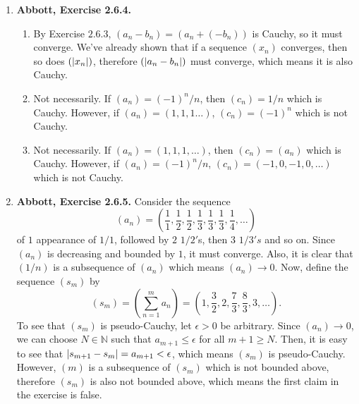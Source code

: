 \documentclass{article}
\DeclarePairedDelimiter\abs{\lvert}{\rvert}
\newcommand{\N}{\mathbb{N}}
\newcommand{\R}{\mathbb{R}}
\newcommand{\exc}[2][Abbott]{\item \textbf{#1, Exercise #2.}}
\newcommand{\lep}[1][L]{#1et $\epsilon > 0$ be arbitrary}
\begin{document}
\begin{enumerate}
\begin{enumerate}
        \item \lep. Since both sequences are Cauchy, we can pick some positive $M_1, M_2 \in \R$ such that $\abs*{x_n} \leq M_1$ and $\abs*{y_n} \leq M_2$ for all $n \in \N$. Choose $N \in \N$ such that $\abs*{x_n-x_m} < \epsilon/(2M_2)$ and $\abs*{y_n-y_m} < \epsilon/(2M_1)$ for all $n, m \geq N$. Then,
        \begin{align*}
            \abs*{x_n y_n - x_m y_m} &= \abs*{x_n y_n - x_n y_m + x_n y_m - x_m y_m} \\
            &\leq \abs*{x_n} \abs*{y_n - y_m} + \abs*{y_m} \abs*{x_n - x_m} \\ &\leq M_1 \abs*{y_n-y_m} + M_2 \abs*{x_n - x_m} < \epsilon
        \end{align*} for all $n,m \geq N$, so $(x_n y_n)$ is Cauchy.
    \end{enumerate}
    
    \exc{2.6.4}
    \begin{enumerate}
        \item By Exercise $2.6.3$, $(a_n - b_n) = (a_n + (-b_n))$ is Cauchy, so it must converge. We've already shown that if a sequence $(x_n)$ converges, then so does $(\abs*{x_n})$, therefore $(\abs*{a_n-b_n})$ must converge, which means it is also Cauchy.
        
        \item Not necessarily. If $(a_n) = (-1)^n/n$, then $(c_n) = 1/n$ which is Cauchy. However, if $(a_n) = (1,1,1\dots)$, $(c_n) = (-1)^n$ which is not Cauchy.
        
        \item Not necessarily. If $(a_n) = (1,1,1,\dots)$, then $(c_n) = (a_n)$ which is Cauchy. However, if $(a_n) = (-1)^n/n$, $(c_n) = (-1, 0,-1, 0, \dots)$ which is not Cauchy.
    \end{enumerate}
    
    \exc{2.6.5}
    Consider the sequence 
    \begin{equation*}
        (a_n) = (\frac{1}{1}, \frac{1}{2}, \frac{1}{2}, \frac{1}{3}, \frac{1}{3}, \frac{1}{3}, \frac{1}{4}, \dots)
    \end{equation*} of $1$ appearance of $1/1$, followed by $2$ $1/2'$s, then $3$ $1/3's$ and so on. Since $(a_n)$ is decreasing and bounded by $1$, it must converge. Also, it is clear that $(1/n)$ is a subsequence of $(a_n)$ which means $(a_n) \to 0$. Now, define the sequence $(s_m)$ by
    \begin{equation*}
        (s_m) = (\sum_{n=1}^m a_n) = (1, \frac{3}{2}, 2, \frac{7}{3}, \frac{8}{3}, 3, \dots).
    \end{equation*} To see that $(s_m)$ is pseudo-Cauchy, \lep[l]. Since $(a_n) \to 0$, we can choose $N \in \N$ such that $a_{m+1} \leq \epsilon$ for all $m+1 \geq N$. Then, it is easy to see that $\abs*{s_{m+1}-s_m} = a_{m+1} < \epsilon$, which means $(s_m)$ is pseudo-Cauchy. However, $(m)$ is a subsequence of $(s_m)$ which is not bounded above, therefore $(s_m)$ is also not bounded above, which means the first claim in the exercise is false.
    

\end{enumerate}
\end{document}
